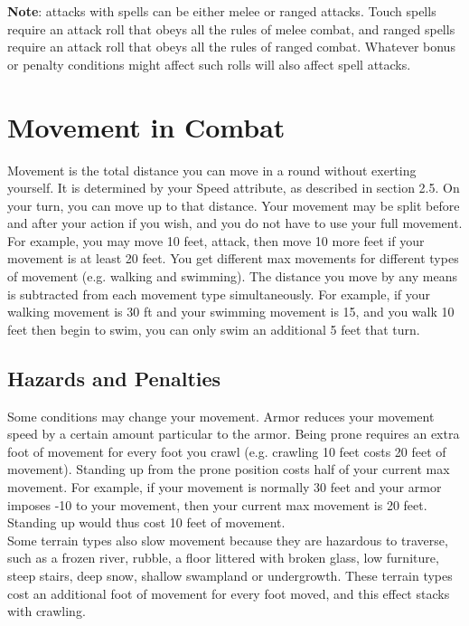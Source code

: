 \begin{tcolorbox}
	\textbf{Note}: attacks with spells can be either melee or ranged attacks. Touch spells require an attack roll that obeys all the rules of melee combat, and ranged spells require an attack roll that obeys all the rules of ranged combat. Whatever bonus or penalty conditions might affect such rolls will also affect spell attacks.
\end{tcolorbox}

\section{Movement in Combat}
Movement is the total distance you can move in a round without exerting yourself. It is determined by your Speed attribute, as described in section 2.5. On your turn, you can move up to that distance. Your movement may be split before and after your action if you wish, and you do not have to use your full movement. For example, you may move 10 feet, attack, then move 10 more feet if your movement is at least 20 feet. You get different max movements for different types of movement (e.g. walking and swimming). The distance you move by any means is subtracted from each movement type simultaneously. For example, if your walking movement is 30 ft and your swimming movement is 15, and you walk 10 feet then begin to swim, you can only swim an additional 5 feet that turn.

\subsection{Hazards and Penalties}
Some conditions may change your movement. Armor reduces your movement speed by a certain amount particular to the armor. Being prone requires an extra foot of movement for every foot you crawl (e.g. crawling 10 feet costs 20 feet of movement). Standing up from the prone position costs half of your current max movement. For example, if your movement is normally 30 feet and your armor imposes -10 to your movement, then your current max movement is 20 feet. Standing up would thus cost 10 feet of movement.\\

Some terrain types also slow movement because they are hazardous to traverse, such as a frozen river, rubble, a floor littered with broken glass, low furniture, steep stairs, deep snow, shallow swampland or undergrowth. These terrain types cost an additional foot of movement for every foot moved, and this effect stacks with crawling.\\

